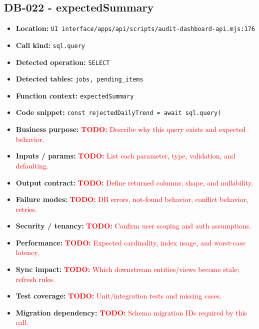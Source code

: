 \documentclass[11pt]{article}
\newcommand{\todoitem}[1]{\textcolor{red}{\textbf{TODO:} #1}}
\begin{document}
\subsection{DB-022 - expectedSummary}
\begin{itemize}[leftmargin=1.5em]
\item \textbf{Location:} \texttt{UI interface/apps/api/scripts/audit-dashboard-api.mjs:176}
\item \textbf{Call kind:} \texttt{sql.query}
\item \textbf{Detected operation:} \texttt{SELECT}
\item \textbf{Detected tables:} \texttt{jobs, pending\_items}
\item \textbf{Function context:} \texttt{expectedSummary}
\item \textbf{Code snippet:} \texttt{const rejectedDailyTrend = await sql.query(}
\item \textbf{Business purpose:} \todoitem{Describe why this query exists and expected behavior.}
\item \textbf{Inputs / params:} \todoitem{List each parameter, type, validation, and defaulting.}
\item \textbf{Output contract:} \todoitem{Define returned columns, shape, and nullability.}
\item \textbf{Failure modes:} \todoitem{DB errors, not-found behavior, conflict behavior, retries.}
\item \textbf{Security / tenancy:} \todoitem{Confirm user scoping and auth assumptions.}
\item \textbf{Performance:} \todoitem{Expected cardinality, index usage, and worst-case latency.}
\item \textbf{Sync impact:} \todoitem{Which downstream entities/views become stale; refresh rules.}
\item \textbf{Test coverage:} \todoitem{Unit/integration tests and missing cases.}
\item \textbf{Migration dependency:} \todoitem{Schema migration IDs required by this call.}
\end{itemize}
\end{document}
